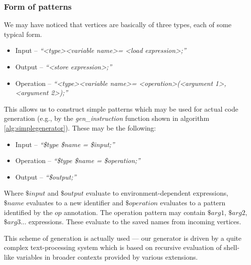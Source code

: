 \subsubsection{Form of patterns}

We may have noticed that vertices are basically of three types, each of some typical form. 

\begin{itemize}
  \item Input -- \emph{``\textless type\textgreater  \textless variable name\textgreater  = \textless load expression\textgreater ;''}
  \item Output -- \emph{``\textless store expression\textgreater ;''}
  \item Operation -- \emph{``\textless type\textgreater  \textless variable name\textgreater  = \textless operation\textgreater (\textless argument 1\textgreater , \textless argument 2\textgreater );''}
\end{itemize}

This allows us to construct simple patterns which may be used for actual code generation (e.g., by the \emph{gen\_instruction} function shown in algorithm \ref{alg:simplegenerator}). These may be the following:

\begin{itemize}
  \item Input -- \emph{``\$type \$name = \$input;''}
  \item Operation -- \emph{``\$type \$name = \$operation;''}
  \item Output -- \emph{``\$output;''}
\end{itemize}

Where $\$input$ and $\$output$ evaluate to environment-dependent expressions, $\$name$ evaluates to a new identifier and $\$operation$ evaluates to a pattern identified by the $op$ annotation. The operation pattern may contain $\$arg1$, $\$arg2$, $\$arg3$... expressions. These evaluate to the saved names from incoming vertices.

This scheme of generation is actually used --- our generator is driven by a quite complex text-processing system which is based on recursive evaluation of shell-like variables in broader contexts provided by various extensions.


